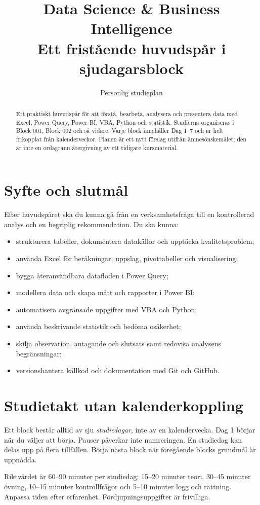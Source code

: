 \documentclass[11pt,a4paper]{article}
\title{Data Science \& Business Intelligence\\\large Ett fristående huvudspår i sjudagarsblock}
\author{Personlig studieplan}
\date{}
\begin{document}
\maketitle
\begin{abstract}
Ett praktiskt huvudspår för att förstå, bearbeta, analysera och presentera data med Excel, Power Query, Power BI, VBA, Python och statistik. Studierna organiseras i Block 001, Block 002 och så vidare. Varje block innehåller Dag 1--7 och är helt frikopplat från kalenderveckor. Planen är ett nytt förslag utifrån ämnesönskemålet; den är inte en ordagrann återgivning av ett tidigare kursmaterial.
\end{abstract}
\tableofcontents
\newpage
\section{Syfte och slutmål}
Efter huvudspåret ska du kunna gå från en verksamhetsfråga till en kontrollerad analys och en begriplig rekommendation. Du ska kunna:
\begin{itemize}
\item strukturera tabeller, dokumentera datakällor och upptäcka kvalitetsproblem;
\item använda Excel för beräkningar, uppslag, pivottabeller och visualisering;
\item bygga återanvändbara dataflöden i Power Query;
\item modellera data och skapa mått och rapporter i Power BI;
\item automatisera avgränsade uppgifter med VBA och Python;
\item använda beskrivande statistik och bedöma osäkerhet;
\item skilja observation, antagande och slutsats samt redovisa analysens begränsningar;
\item versionshantera källkod och dokumentation med Git och GitHub.
\end{itemize}

\section{Studietakt utan kalenderkoppling}
Ett block består alltid av sju \emph{studiedagar}, inte av en kalendervecka. Dag 1 börjar när du väljer att börja. Pauser påverkar inte numreringen. En studiedag kan delas upp på flera tillfällen. Börja nästa block när föregående blocks grundmål är uppnådda.

Riktvärdet är 60--90 minuter per studiedag: 15--20 minuter teori, 30--45 minuter övning, 10--15 minuter kontrollfrågor och 5--10 minuter logg och rättning. Anpassa tiden efter erfarenhet. Fördjupningsuppgifter är frivilliga.
\end{document}

